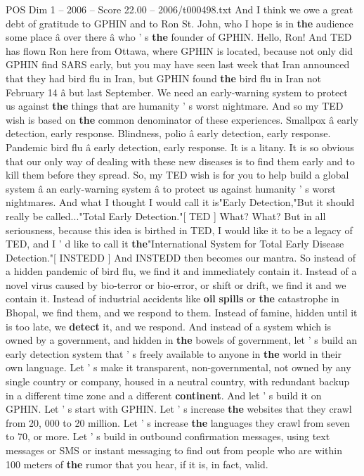 \begin{textsample}{POS Dim 1 – 2006 – Score 22.00 – 2006/t000498.txt}
And I think we owe a great debt of gratitude to GPHIN and to Ron St.
John, who I hope is in \textbf{the} audience some place â over there â who ' s \textbf{the} founder of GPHIN.
Hello, Ron!
And TED has flown Ron here from Ottawa, where GPHIN is located, because not only did GPHIN find SARS early, but you may have seen last week that Iran announced that they had bird flu in Iran, but GPHIN found \textbf{the} bird flu in Iran not February 14 â but last September.
We need an early-warning system to protect us against \textbf{the} things that are humanity ' s worst nightmare.
And so my TED wish is based on \textbf{the} common denominator of these experiences.
Smallpox â early detection, early response.
Blindness, polio â early detection, early response.
Pandemic bird flu â early detection, early response.
It is a litany.
It is so obvious that our only way of dealing with these new diseases is to find them early and to kill them before they spread.
So, my TED wish is for you to help build a global system â an early-warning system â to protect us against humanity ' s worst nightmares.
And what I thought I would call it is"Early Detection,"But it should really be called..."Total Early Detection."[ TED ] What?
What?
But in all seriousness, because this idea is birthed in TED, I would like it to be a legacy of TED, and I ' d like to call it \textbf{the}"International System for Total Early Disease Detection."[ INSTEDD ] And INSTEDD then becomes our mantra.
So instead of a hidden pandemic of bird flu, we find it and immediately contain it.
Instead of a novel virus caused by bio-terror or bio-error, or shift or drift, we find it and we contain it.
Instead of industrial accidents like \textbf{oil} \textbf{spills} or \textbf{the} catastrophe in Bhopal, we find them, and we respond to them.
Instead of famine, hidden until it is too late, we \textbf{detect} it, and we respond.
And instead of a system which is owned by a government, and hidden in \textbf{the} bowels of government, let ' s build an early detection system that ' s freely available to anyone in \textbf{the} world in their own language.
Let ' s make it transparent, non-governmental, not owned by any single country or company, housed in a neutral country, with redundant backup in a different time zone and a different \textbf{continent}.
And let ' s build it on GPHIN.
Let ' s start with GPHIN.
Let ' s increase \textbf{the} websites that they crawl from 20, 000 to 20 million.
Let ' s increase \textbf{the} languages they crawl from seven to 70, or more.
Let ' s build in outbound confirmation messages, using text messages or SMS or instant messaging to find out from people who are within 100 meters of \textbf{the} rumor that you hear, if it is, in fact, valid.

\end{textsample}
